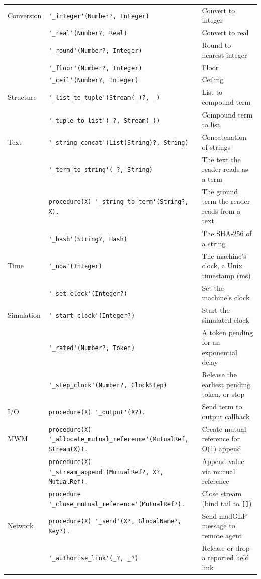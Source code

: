 \begin{center}
{\begin{tabular}{@{}l@{\hspace{4pt}}l@{\hspace{4pt}}p{}@{}}
\hline
Conversion & \verb|'_integer'(Number?, Integer)| & Convert to integer \\
 & \verb|'_real'(Number?, Real)| & Convert to real \\
 & \verb|'_round'(Number?, Integer)| & Round to nearest integer \\
 & \verb|'_floor'(Number?, Integer)| & Floor \\
 & \verb|'_ceil'(Number?, Integer)| & Ceiling \\
\hline
Structure & \verb|'_list_to_tuple'(Stream(_)?, _)| & List to compound term \\
 & \verb|'_tuple_to_list'(_?, Stream(_))| & Compound term to list \\
\hline
Text & \verb|'_string_concat'(List(String)?, String)| & Concatenation of strings \\
 & \verb|'_term_to_string'(_?, String)| & The text the reader reads as a term \\
 & \verb|procedure(X) '_string_to_term'(String?, X).| & The ground term the reader reads from a text \\
 & \verb|'_hash'(String?, Hash)| & The SHA-256 of a string \\
\hline
Time & \verb|'_now'(Integer)| & The machine's clock, a Unix timestamp (ms) \\
 & \verb|'_set_clock'(Integer?)| & Set the machine's clock \\
\hline
Simulation & \verb|'_start_clock'(Integer?)| & Start the simulated clock \\
 & \verb|'_rated'(Number?, Token)| & A token pending for an exponential delay \\
 & \verb|'_step_clock'(Number?, ClockStep)| & Release the earliest pending token, or stop \\
\hline
I/O & \verb|procedure(X) '_output'(X?).| & Send term to output callback \\
\hline
MWM & \verb|procedure(X) '_allocate_mutual_reference'(MutualRef, Stream(X)).| & Create mutual reference for O(1) append \\
 & \verb|procedure(X) '_stream_append'(MutualRef?, X?, MutualRef).| & Append value via mutual reference \\
 & \verb|procedure '_close_mutual_reference'(MutualRef?).| & Close stream (bind tail to \verb|[]|) \\
\hline
Network & \verb|procedure(X) '_send'(X?, GlobalName?, Key?).| & Send madGLP message to remote agent \\
 & \verb|'_authorise_link'(_?, _?)| & Release or drop a reported held link \\

\end{tabular}}
\end{center}
